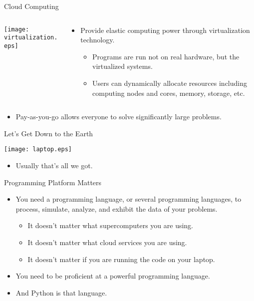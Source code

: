 \documentclass[dvips,xcolor=pst,14pt]{beamer}
\begin{document}
\begin{frame}{
%
Cloud Computing
%
}
\begin{columns}
  \begin{column}{0.35\textwidth}
    \centering
    \texttt{[image: virtualization.eps]}
  \end{column}
  \begin{column}{0.65\textwidth}
    \begin{itemize}
    \item Provide \alert{elastic} computing power through virtualization
    technology.
    \begin{itemize}
      \item Programs are run not on real hardware, but the virtualized systems.
      \item Users can dynamically allocate resources including computing nodes and
      cores, memory, storage, etc.
    \end{itemize}
    \end{itemize}
  \end{column}
\end{columns}
\begin{itemize}
  \item Pay-as-you-go allows everyone to solve significantly large problems.
\end{itemize}
\end{frame}

\begin{frame}{
%
Let's Get Down to the Earth
%
}
\begin{center}
  \texttt{[image: laptop.eps]}
\end{center}
\begin{itemize}
  \item Usually that's all we got.
\end{itemize}
\end{frame}

\begin{frame}{
%
Programming Platform Matters
%
}
\begin{itemize}
  \item You need a programming language, or several programming languages, to
  process, simulate, analyze, and exhibit the data of your problems.
  \begin{itemize}
    \item It doesn't matter what supercomputers you are using.
    \item It doesn't matter what cloud services you are using.
    \item It doesn't matter if you are running the code on your laptop.
  \end{itemize}
  \item You need to be proficient at a powerful programming language.
  \item And Python is that language.
\end{itemize}
\end{frame}
\end{document}
